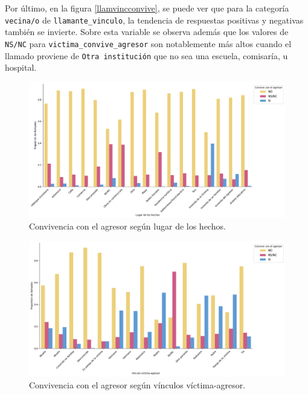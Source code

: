 \documentclass[10 pt]{article}
\begin{document}
Por último, en la figura \ref{llamvincconvive}, se puede ver que para la categoría \texttt{vecina/o} de \texttt{llamante\_vinculo}, la tendencia de respuestas positivas y negativas también se invierte. Sobre esta variable se observa además que los valores de \texttt{NS/NC} para \texttt{victima\_convive\_agresor} son notablemente más altos cuando el llamado proviene de \texttt{Otra institución} que no sea una escuela, comisaría, u hospital. 


\begin{figure}[H]
\begin{center}
\includegraphics[scale=.5]{images/latex_hecho_lugar_convive.png}
\caption{Convivencia con el agresor según lugar de los hechos.}
\label{hecholugconvive}
\end{center}
\end{figure}
    
\begin{figure}[H]
\begin{center}
\includegraphics[scale=.5]{images/convive_vinc_agresor.png}
\caption{Convivencia con el agresor según vínculos víctima-agresor.}
\label{agrvincconvive}
\end{center}
\end{figure} 
\end{document}
